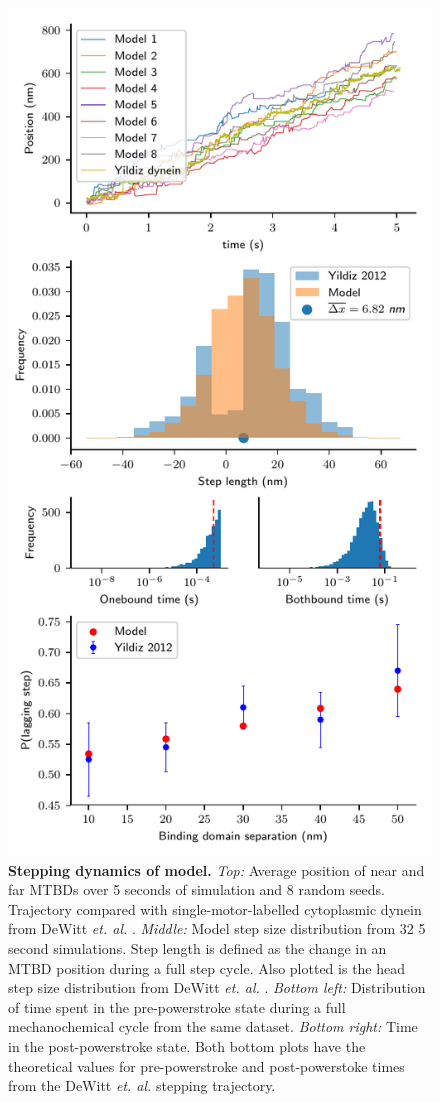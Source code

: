\documentclass[9pt,twocolumn,twoside]{pnas-new}
\begin{document}
\begin{figure}[tbhp]
  \centering
  \includegraphics[width=\linewidth]{../../plots/paper_model_behavior}
\caption{\textbf{Stepping dynamics of model.} \textit{Top: } Average position of near and far MTBDs over 5 seconds of simulation and 8 random seeds. Trajectory compared with single-motor-labelled cytoplasmic dynein from DeWitt \textit{et. al.} \cite{yildizpaper}. \textit{Middle: } Model step size distribution from 32 5 second simulations. Step length is defined as the change in an MTBD position during a full step cycle. Also plotted is the head step size distribution from DeWitt \textit{et. al.} \cite{yildizpaper}. \textit{Bottom left: } Distribution of time spent in the pre-powerstroke state during a full mechanochemical cycle from the same dataset. \textit{Bottom right: } Time in the post-powerstroke state. Both bottom plots have the theoretical values for pre-powerstroke and post-powerstoke times from the DeWitt \textit{et. al.} stepping trajectory.}

\end{figure}
\end{document}
